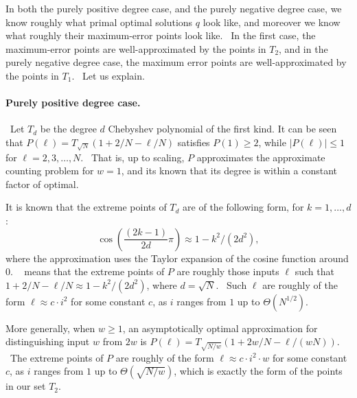 \documentclass[10pt,a4paper]{article}
\newcommand{\<}{\langle}
\renewcommand{\>}{\rangle}
\newcommand{\para}[1]{\paragraph{#1}}
\begin{document}
In both the purely positive degree case, and the purely negative degree
case, we know roughly what primal optimal solutions $q$ look like, and
moreover we know what roughly their maximum-error points look like. \ In the
first case, the maximum-error points are well-approximated by the points in $
T_{2}$, and in the purely negative degree case, the maximum error points are
well-approximated by the points in $T_{1}$. \ Let us explain.

\para{Purely positive degree case.} \ Let $T_{d}$ be
the degree $d$ Chebyshev polynomial of the first kind.  It can be seen that $
P(\ell )=T_{\sqrt{N}}\left( 1+2/N-\ell /N\right) $ satisfies $P(1)\geq 2$,
while $|P(\ell )|\leq 1$ for $\ell =2,3,\dots ,N$. \ That is, up to scaling,
$P$ approximates the approximate counting problem for $w=1$, and its known
that its degree is within a constant factor of optimal.

It is known that the extreme points of $T_{d}$ are of the following form,
for $k=1,\dots ,d$:
\begin{equation}
\cos \left( \frac{(2k-1)}{2d}\pi \right) \approx 1-k^{2}/(2d^{2}),
\label{tester}
\end{equation}
where the approximation uses the Taylor expansion of the cosine function
around $0$. \  means that the extreme points of $P$
are roughly those inputs $\ell $ such that $1+2/N-\ell /N\approx
1-k^{2}/(2d^{2})$, where $d=\sqrt{N}$. \ Such $\ell $ are roughly of the
form $\ell \approx c\cdot i^{2}$ for some constant $c$, as $i$ ranges from $1
$ up to $\Theta (N^{1/2})$.

More generally, when $w\geq 1$, an asymptotically optimal approximation for
distinguishing input $w$ from $2w$ is $P(\ell )=T_{\sqrt{N/w}}\left(
1+2w/N-\ell /(wN)\right) $. \ The extreme points of $P$ are roughly of the
form $\ell \approx c\cdot i^{2}\cdot w$ for some constant $c$, as $i$ ranges
from $1$ up to $\Theta (\sqrt{N/w})$, which is exactly the form of the
points in our set $T_{2}$.
\end{document}
